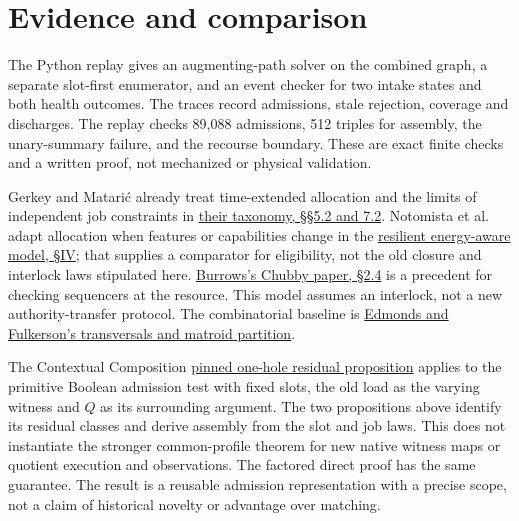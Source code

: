 \documentclass[11pt]{article}
\begin{document}
\section{Evidence and comparison}
The Python replay gives an augmenting-path solver on the combined graph, a separate slot-first enumerator, and an event checker for two intake states and both health outcomes. The traces record admissions, stale rejection, coverage and discharges. The replay checks 89,088 admissions, 512 triples for assembly, the unary-summary failure, and the recourse boundary. These are exact finite checks and a written proof, not mechanized or physical validation.

Gerkey and Matari\'c already treat time-extended allocation and the limits of independent job constraints in \href{https://robotics.usc.edu/publications/media/uploads/pubs/347.pdf}{their taxonomy, \S\S5.2 and 7.2}. Notomista et al. adapt allocation when features or capabilities change in the \href{https://arxiv.org/pdf/2105.05586}{resilient energy-aware model, \S IV}; that supplies a comparator for eligibility, not the old closure and interlock laws stipulated here. \href{https://static.usenix.org/events/osdi06/tech/full_papers/burrows/burrows_html/}{Burrows's Chubby paper, \S2.4} is a precedent for checking sequencers at the resource. This model assumes an interlock, not a new authority-transfer protocol. The combinatorial baseline is \href{https://nvlpubs.nist.gov/nistpubs/jres/69B/jresv69Bn3p147_A1b.pdf}{Edmonds and Fulkerson's transversals and matroid partition}.

The Contextual Composition \href{https://github.com/eternal-november/eos-research-programmes/blob/115957abf158dad89c86ca354a69081a3114ba2d/projects/contextual-composition/feedback-and-concurrency/observable-covers/Residual_Profiles_and_Admission_Reflection.tex}{pinned one-hole residual proposition} applies to the primitive Boolean admission test with fixed slots, the old load as the varying witness and $Q$ as its surrounding argument. The two propositions above identify its residual classes and derive assembly from the slot and job laws. This does not instantiate the stronger common-profile theorem for new native witness maps or quotient execution and observations. The factored direct proof has the same guarantee. The result is a reusable admission representation with a precise scope, not a claim of historical novelty or advantage over matching.
\end{document}

